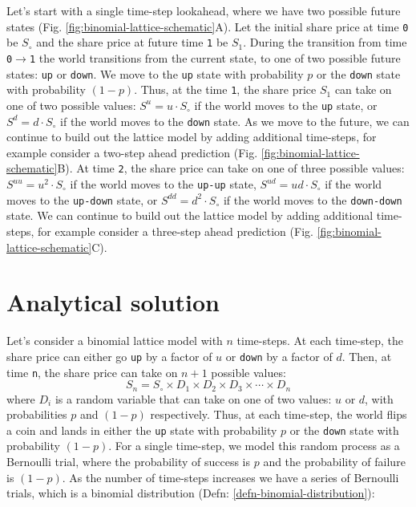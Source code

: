 \documentclass[11pt]{article}
\theoremstyle{definition}
\begin{document}
Let's start with a single time-step lookahead, where we have two possible future states (Fig. \ref{fig:binomial-lattice-schematic}A).
Let the initial share price at time \texttt{0} be $S_{\circ}$ and the share price at future time \texttt{1} be $S_{1}$.
During the transition from time \texttt{0}$\rightarrow$\texttt{1} the world transitions from the current state, to one of two possible future states: \texttt{up} or \texttt{down}.
We move to the \texttt{up} state with probability $p$ or the \texttt{down} state with probability $(1-p)$.
Thus, at the time \texttt{1}, the share price $S_{1}$ can take on one of two possible values: $S^{u} = u\cdot{S_{\circ}}$ if the world moves 
to the \texttt{up} state, or $S^{d} = d\cdot{S_{\circ}}$ if the world moves to the \texttt{down} state. 
As we move to the future, we can continue to build out the lattice model by adding additional time-steps, 
for example consider a two-step ahead prediction (Fig. \ref{fig:binomial-lattice-schematic}B). 
At time \texttt{2}, the share price can take on one of three possible values: $S^{uu} = u^{2}\cdot{S_{\circ}}$ if the world moves
to the \texttt{up-up} state, $S^{ud} = ud\cdot{S_{\circ}}$ if the world moves to the \texttt{up-down} state, or $S^{dd} = d^{2}\cdot{S_{\circ}}$ if the world moves to the \texttt{down-down} state.
We can continue to build out the lattice model by adding additional time-steps, for example consider a three-step ahead prediction (Fig. \ref{fig:binomial-lattice-schematic}C).

\section*{Analytical solution}
Let's consider a binomial lattice model with $n$ time-steps. At each time-step, the share price can either go \texttt{up} by a factor of $u$ or \texttt{down} by a factor of $d$.
Then, at time \texttt{n}, the share price can take on $n+1$ possible values: 
\begin{equation}
	S_{n} = S_{\circ}\times{D_{1}}\times{D_{2}}\times{D_{3}}\times\cdots\times{D_{n}}
\end{equation}
where $D_{i}$ is a random variable that can take on one of two values: $u$ or $d$, 
with probabilities $p$ and $(1-p)$ respectively. 
Thus, at each time-step, the world flips a coin and lands in either the \texttt{up} state with probability $p$ or the \texttt{down} state with probability $(1-p)$.
For a single time-step, we model this random process as a Bernoulli trial, where the probability of success is $p$ and the probability of failure is $(1-p)$.
As the number of time-steps increases we have a series of Bernoulli trials, which is a binomial distribution (Defn: \ref{defn-binomial-distribution}):
\end{document}

